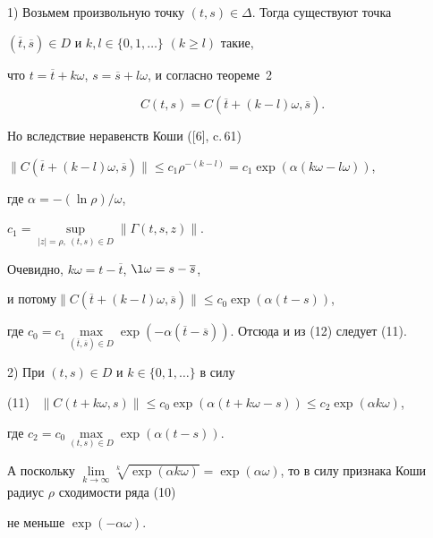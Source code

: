 \addtocounter{footnote}{-1}





\begin{pf}


1) Возьмем произвольную точку $(t,s)\in\Delta$. Тогда существуют точка


$(\overline t,\overline{s})\in D$ и $k,l\in\{0,1,\dotsc\}$ $(k\ge l)$ такие,


что $t=\overline{t}+k\omega$, $s=\overline{s}+l\omega$, и согласно теореме~2


\begin{equation}


C(t,s)=C(\overline{t}+(k-l)\omega,\overline{s}).


\end{equation}


Но вследствие неравенств Коши ([6], c.\,61)


$\| C(\overline{t}+(k-l)\omega,\overline{s})\|\le c_1\rho^{-(k-l)}=


c_1 \exp(\alpha(k\omega-l\omega))$,


где $\alpha=-(\ln\rho)/\omega$,


$c_1=\sup\limits_{|z|=\rho,\ (t,s)\in D}\|\Gamma(t,s,z)\|$.


Очевидно, $k\omega=t-\overline{t}$, $\l\omega=s-\overline{s}$,


и потому\linebreak $\| C(\overline{t}+(k-l)\omega,\overline{s})\|\le c_0


\exp(\alpha(t-s))$,


где $c_0=c_1 \max\limits_{(\overline{t},\overline{s})\in D} \exp(-\alpha


(\overline{t}-\overline{s}))$. Отсюда и из (12) следует (11).





2) При $(t,s)\in D$ и $k\in\{0,1,\dotsc\}$ в силу


(11) \ $\| C(t+k\omega,s)\|\le c_0 \exp(\alpha(t+k\omega-s))\le c_2 \exp


(\alpha k\omega)$,


где $c_2=c_0\max\limits_{(t,s)\in D}\exp(\alpha(t-s))$.


А поскольку $\lim\limits_{k\to\infty}\sqrt[k]{\exp(\alpha k\omega)}=\exp


(\alpha\omega)$, то в силу признака Коши радиус $\rho$ сходимости ряда (10)


не меньше $\exp(-\alpha\omega)$.


\end{pf}





